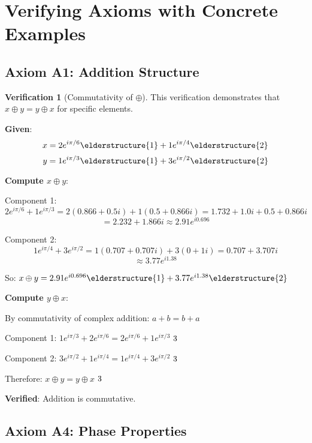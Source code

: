 \documentclass[12pt,a4paper]{article}
\newcommand{\checkmark}{\ding{51}}
\theoremstyle{definition}
\newtheorem{verification}{Verification}[section]
\theoremstyle{remark}
\begin{document}
\newpage
\section{Verifying Axioms with Concrete Examples}

\subsection{Axiom A1: Addition Structure}

\begin{verification}[Commutativity of $\oplus$]
This verification demonstrates that $x \oplus y = y \oplus x$ for specific elements.

\textbf{Given}:
$$x = 2e^{i\pi/6} \elderstructure{1} + 1e^{i\pi/4} \elderstructure{2}$$
$$y = 1e^{i\pi/3} \elderstructure{1} + 3e^{i\pi/2} \elderstructure{2}$$

\textbf{Compute $x \oplus y$}:

Component 1:
$$2e^{i\pi/6} + 1e^{i\pi/3} = 2(0.866 + 0.5i) + 1(0.5 + 0.866i) = 1.732 + 1.0i + 0.5 + 0.866i$$
$$= 2.232 + 1.866i \approx 2.91e^{i0.696}$$

Component 2:
$$1e^{i\pi/4} + 3e^{i\pi/2} = 1(0.707 + 0.707i) + 3(0 + 1i) = 0.707 + 3.707i$$
$$\approx 3.77e^{i1.38}$$

So: $x \oplus y = 2.91e^{i0.696} \elderstructure{1} + 3.77e^{i1.38} \elderstructure{2}$

\textbf{Compute $y \oplus x$}:

By commutativity of complex addition: $a + b = b + a$

Component 1: $1e^{i\pi/3} + 2e^{i\pi/6} = 2e^{i\pi/6} + 1e^{i\pi/3}$ $\checkmark$

Component 2: $3e^{i\pi/2} + 1e^{i\pi/4} = 1e^{i\pi/4} + 3e^{i\pi/2}$ $\checkmark$

Therefore: $x \oplus y = y \oplus x$ $\checkmark$

\textbf{Verified}: Addition is commutative.
\end{verification}

\subsection{Axiom A4: Phase Properties}
\end{document}
